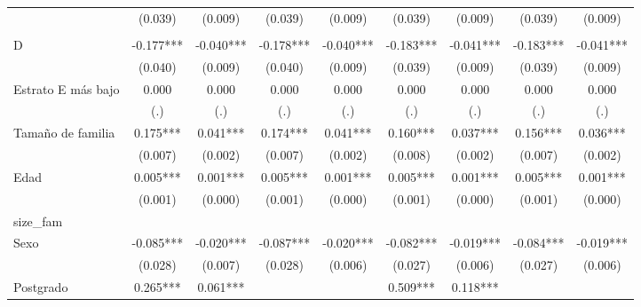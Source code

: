 \begin{table}
{\begin{threeparttable}
\begin{tabular}{lcccccccc}
                    &     (0.039)   &     (0.009)   &     (0.039)   &     (0.009)   &     (0.039)   &     (0.009)   &     (0.039)   &     (0.009)   \\
                    &               &               &               &               &               &               &               &               \\
D                   &      -0.177***&      -0.040***&      -0.178***&      -0.040***&      -0.183***&      -0.041***&      -0.183***&      -0.041***\\
                    &     (0.040)   &     (0.009)   &     (0.040)   &     (0.009)   &     (0.039)   &     (0.009)   &     (0.039)   &     (0.009)   \\
Estrato E más bajo  &       0.000   &       0.000   &       0.000   &       0.000   &       0.000   &       0.000   &       0.000   &       0.000   \\
                    &         (.)   &         (.)   &         (.)   &         (.)   &         (.)   &         (.)   &         (.)   &         (.)   \\
Tamaño de familia   &       0.175***&       0.041***&       0.174***&       0.041***&       0.160***&       0.037***&       0.156***&       0.036***\\
                    &     (0.007)   &     (0.002)   &     (0.007)   &     (0.002)   &     (0.008)   &     (0.002)   &     (0.007)   &     (0.002)   \\
Edad                &       0.005***&       0.001***&       0.005***&       0.001***&       0.005***&       0.001***&       0.005***&       0.001***\\
                    &     (0.001)   &     (0.000)   &     (0.001)   &     (0.000)   &     (0.001)   &     (0.000)   &     (0.001)   &     (0.000)   \\
size\_fam            &               &               &               &               &               &               &               &               \\
Sexo                &      -0.085***&      -0.020***&      -0.087***&      -0.020***&      -0.082***&      -0.019***&      -0.084***&      -0.019***\\
                    &     (0.028)   &     (0.007)   &     (0.028)   &     (0.006)   &     (0.027)   &     (0.006)   &     (0.027)   &     (0.006)   \\
Postgrado           &       0.265***&       0.061***&               &               &       0.509***&       0.118***&               &               \\

\end{tabular}
\end{threeparttable}}
\end{table}
